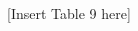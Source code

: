 \documentclass[12pt]{article}%
\begin{document}
\begin{CJK*}{GBK}{fs}
\begin{center}
  [Insert Table 9 here]
\end{center}



\end{CJK*}
\end{document}
